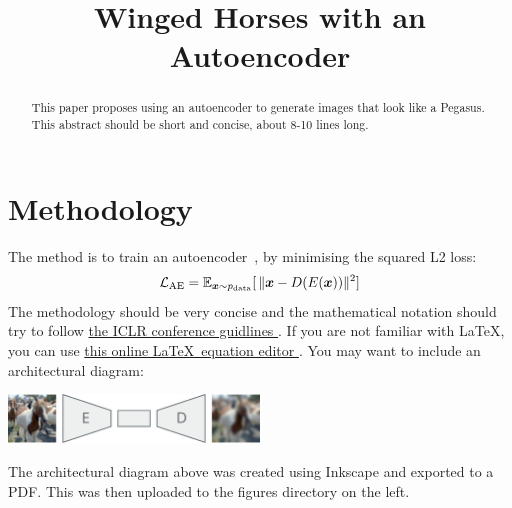 \documentclass{article}
\title{Winged Horses with an Autoencoder}
\begin{document}
\maketitle
\begin{abstract}
    This paper proposes using an autoencoder to generate images that look like a Pegasus. This abstract should be short and concise, about 8-10 lines long.
\end{abstract}

\section{Methodology}
The method is to train an autoencoder~\cite{kramer1991nonlinear}, by minimising the squared L2 loss:
\begin{equation}
    \mathcal{L}_{\textrm{AE}} = \mathbb{E}_{{\bm{x}}\sim p_{\textrm{data}}}[\, \lVert {\bm{x}} - D(E({\bm{x}})) \rVert^2 ]
\end{equation}
The methodology should be very concise and the mathematical notation should try to follow \href{https://v1.overleaf.com/latex/templates/template-for-iclr-2021-conference-submission/mmpfhsxmqdkp.pdf}{the ICLR conference guidlines \faExternalLink}. If you are not familiar with \LaTeX, you can use \href{https://www.codecogs.com/latex/eqneditor.php}{this online \LaTeX~equation editor \faExternalLink}. You may want to include an architectural diagram:
\begin{center}
    \includegraphics[width=0.5\textwidth]{figures/architecture.pdf}
\end{center}
The architectural diagram above was created using Inkscape and exported to a PDF. This was then uploaded to the figures directory on the left.
\end{document}
